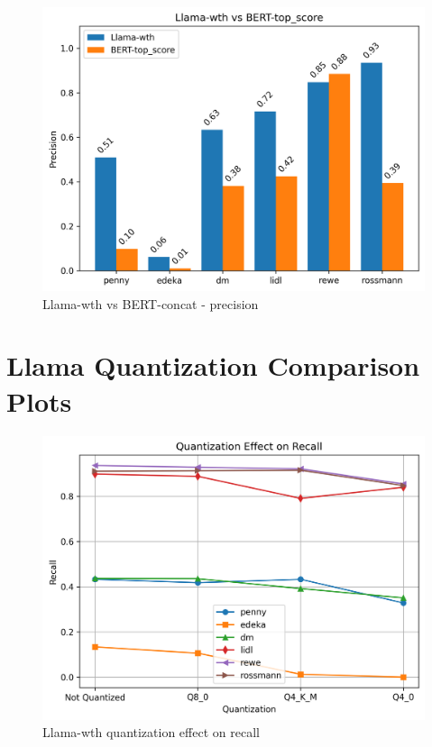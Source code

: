 \documentclass[licencjacka,en]{pracamgr}
\begin{document}
\begin{appendices}
\begin{figure}[ht]
    \centering
    \includegraphics[width=0.8\linewidth]{bachelor_images/benchmark/llama_vs_bert_precision.png}
    \caption{Llama-wth vs BERT-concat - precision}
    \label{fig:llama_vs_bert_precision}
\end{figure}

\chapter{Llama Quantization Comparison Plots} \label{app:quant_comp}
\begin{figure}[ht]
    \centering
    \includegraphics[width=0.8\linewidth]{bachelor_images/quant_comp/quantization_effect_on_recall.png}
    \caption{Llama-wth quantization effect on recall}
    \label{fig:quantization_effect_on_recall}
\end{figure}


\end{appendices}
\end{document}
